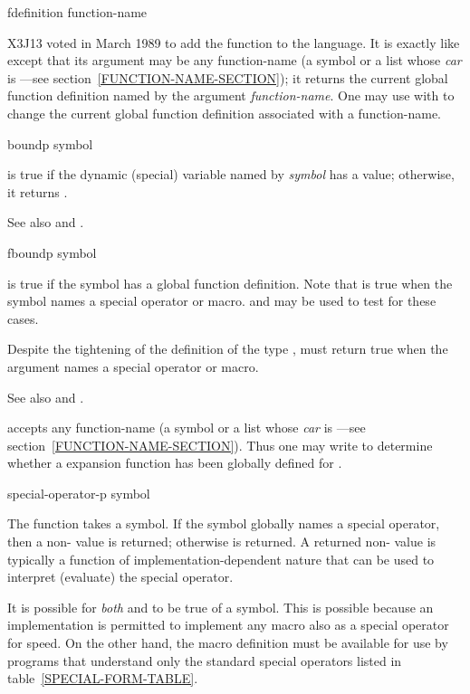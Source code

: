\begin{defun}[Function]
fdefinition function-name

X3J13 voted in March 1989  to add the function
 to the language.
It is exactly like 
except that its argument may be any function-name (a symbol or a list
whose \emph{car} is ---see section~\ref{FUNCTION-NAME-SECTION});
it returns the current global function
definition named by the argument \emph{function-name}.
One may use  with 
to change the current global function definition associated with
a function-name.
\end{defun}

\begin{defun}[Function]
boundp symbol

 is true if the dynamic (special) variable named by \emph{symbol}
has a value; otherwise, it returns {\false}.

See also  and .
\end{defun}

\begin{defun}[Function]
fboundp symbol

 is true if the symbol has a global function definition.
Note that  is true when the symbol names a special operator or
macro.   and  may be used to test
for these cases.

Despite the tightening of the definition of the type ,
 must return true when the argument names a special operator or
macro.

See also  and .

accepts any function-name (a symbol or a list
whose \emph{car} is ---see section~\ref{FUNCTION-NAME-SECTION}).
Thus one may write  to determine whether a 
expansion function has been globally defined for .
\end{defun}

\begin{defun}[Function]
special-operator-p symbol

The function  takes a symbol.  If the symbol
globally names a special operator,
then a non-{\false} value is returned; otherwise {\false} is returned.
A returned non-{\nil} value is typically a function
of implementation-dependent nature that can be used to
interpret (evaluate) the special operator.

It is possible for \emph{both}  and 
to be true of a symbol.  This is possible because an implementation is
permitted to implement any macro also as a special operator for speed.
On the other hand, the macro definition must be available
for use by programs that understand only the standard special operators
listed in table~\ref{SPECIAL-FORM-TABLE}.
\end{defun}

